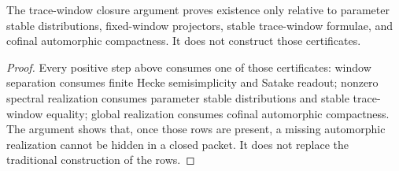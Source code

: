 \begin{theorem}
\label{thm:unified-reality-trace-window-closure-boundary}
The trace-window closure argument proves existence only relative to
parameter stable distributions, fixed-window projectors, stable
trace-window formulae, and cofinal automorphic compactness. It does not
construct those certificates.
\end{theorem}
\begin{proof}
Every positive step above consumes one of those certificates: window
separation consumes finite Hecke semisimplicity and Satake readout;
nonzero spectral realization consumes parameter stable distributions and
stable trace-window equality; global realization consumes cofinal
automorphic compactness. The argument shows that, once those rows are
present, a missing automorphic realization cannot be hidden in a closed
packet. It does not replace the traditional construction of the rows.
\end{proof}
